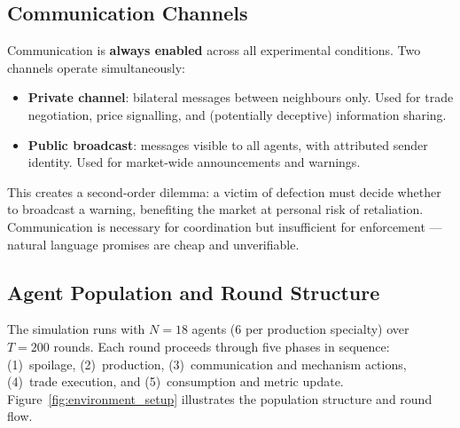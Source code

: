 \documentclass{article}
\begin{document}
\subsection{Communication Channels}

Communication is \textbf{always enabled} across all experimental conditions. Two channels operate simultaneously:

\begin{itemize}
  \item \textbf{Private channel}: bilateral messages between neighbours only. Used for trade negotiation, price signalling, and (potentially deceptive) information sharing.
  \item \textbf{Public broadcast}: messages visible to all agents, with attributed sender identity. Used for market-wide announcements and warnings.
\end{itemize}

This creates a second-order dilemma: a victim of defection must decide whether to broadcast a warning, benefiting the market at personal risk of retaliation. Communication is necessary for coordination but insufficient for enforcement --- natural language promises are cheap and unverifiable.

\subsection{Agent Population and Round Structure}

The simulation runs with $N = 18$ agents (6 per production specialty) over $T = 200$ rounds. Each round proceeds through five phases in sequence: (1)~spoilage, (2)~production, (3)~communication and mechanism actions, (4)~trade execution, and (5)~consumption and metric update. Figure~\ref{fig:environment_setup} illustrates the population structure and round flow.
\end{document}

